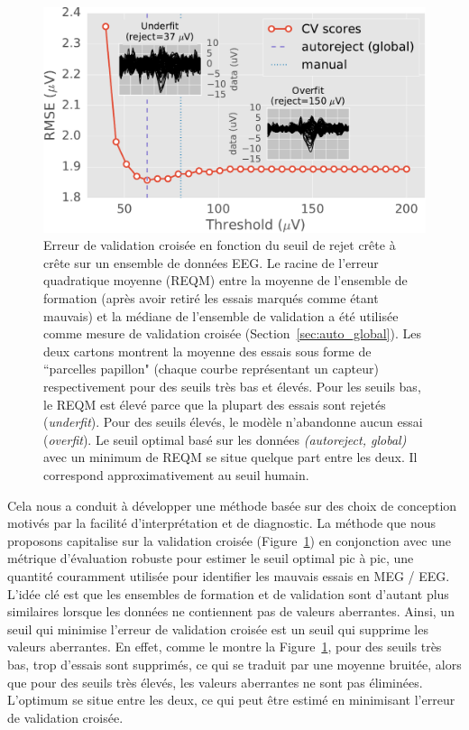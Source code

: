 \begin{figure}[htb]
	\centering
	\includegraphics[width=0.8\linewidth]{figures/figure1.pdf}
    \caption[]{Erreur de validation croisée en fonction du seuil de rejet crête à crête sur un ensemble de données EEG. Le racine de l'erreur quadratique moyenne (REQM) entre la moyenne de l'ensemble de formation (après avoir retiré les essais marqués comme étant mauvais) et la médiane de l'ensemble de validation a été utilisée comme mesure de validation croisée (Section~\ref{sec:auto_global}). Les deux cartons montrent la moyenne des essais sous forme de ``parcelles papillon" (chaque courbe représentant un capteur) respectivement pour des seuils très bas et élevés. Pour les seuils bas, le REQM est élevé parce que la plupart des essais sont rejetés (\emph{underfit}). Pour des seuils élevés, le modèle n'abandonne aucun essai (\emph{overfit}). Le seuil optimal basé sur les données \emph{(autoreject, global)} avec un minimum de REQM se situe quelque part entre les deux. Il correspond approximativement au seuil humain.}
    \label{fig:sommaire:cross_val}
\end{figure}

Cela nous a conduit à développer une méthode basée sur des choix de conception motivés par la facilité d’interprétation et de diagnostic. La méthode que nous proposons capitalise sur la validation croisée (Figure~\ref{fig:sommaire:cross_val}) en conjonction avec une métrique d'évaluation robuste pour estimer le seuil optimal pic à pic, une quantité couramment utilisée pour identifier les mauvais essais en MEG / EEG. L'idée clé est que les ensembles de formation et de validation sont d’autant plus similaires lorsque les données ne contiennent pas de valeurs aberrantes. Ainsi, un seuil qui minimise l'erreur de validation croisée est un seuil qui supprime les valeurs aberrantes. En effet, comme le montre la Figure~\ref{fig:sommaire:cross_val}, pour des seuils très bas, trop d'essais sont supprimés, ce qui se traduit par une moyenne bruitée, alors que pour des seuils très élevés, les valeurs aberrantes ne sont pas éliminées. L’optimum se situe entre les deux, ce qui peut être estimé en minimisant l’erreur de validation croisée.

